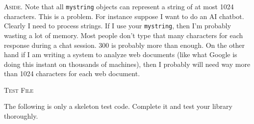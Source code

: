 \textsc{Aside.}
Note that all \verb!mystring! objects can represent a string of at most 1024 characters. This is a
problem. For instance suppose I want to do an AI chatbot.
Clearly I need to process strings. If I use your
\verb!mystring!, then I'm probably wasting a lot of memory. Most people don't type that many characters for
each response during a chat session. 300 is probably more than enough. On the other hand if I am
writing a system to analyze web documents (like what Google is doing this instant on thousands of
machines), then I probably will need way more than 1024 characters for each web document.





\newpage
\textsc{Test File}

The following is only a skeleton test code. Complete it and test your library thoroughly.
